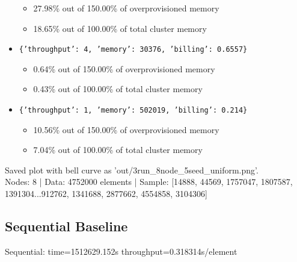\documentclass[]{interact}
\theoremstyle{plain}
\theoremstyle{definition}
\theoremstyle{remark}
\begin{document}
\begin{itemize}
    \begin{itemize}
        \item 27.98\% out of 150.00\% of overprovisioned memory
        \item 18.65\% out of 100.00\% of total cluster memory
    \end{itemize}
    \item \texttt{\{'throughput': 4, 'memory': 30376, 'billing': 0.6557\}}
    \begin{itemize}
        \item 0.64\% out of 150.00\% of overprovisioned memory
        \item 0.43\% out of 100.00\% of total cluster memory
    \end{itemize}
    \item \texttt{\{'throughput': 1, 'memory': 502019, 'billing': 0.214\}}
    \begin{itemize}
        \item 10.56\% out of 150.00\% of overprovisioned memory
        \item 7.04\% out of 100.00\% of total cluster memory
    \end{itemize}
\end{itemize}
Saved plot with bell curve as 'out/3run\_8node\_5seed\_uniform.png'.\\
Nodes: 8 | Data: 4752000 elements | Sample: [14888, 44569, 1757047, 1807587, 1391304...912762, 1341688, 2877662, 4554858, 3104306]

\subsection{Sequential Baseline}
Sequential: time=1512629.152\textmu s throughput=0.318314\textmu s/element
\end{document}
